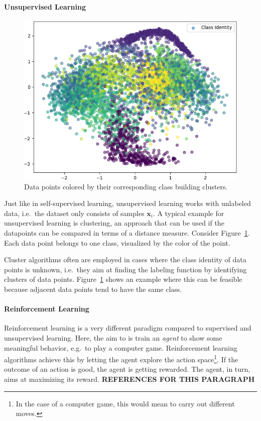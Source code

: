 \paragraph{Unsupervised Learning}
\begin{figure}
    \centering
    \includegraphics[width=.48\textwidth]{images/vlae_embeddings/embeddings_mu_3_6.png}
    \caption[Clusters of data points]{Data points colored by their corresponding class building clusters.}
    \label{fig:clustering_example}
\end{figure}
Just like in self-supervised learning, unsupervised learning works with unlabeled data, i.e.~the dataset only consists of samples $\bm{x}_i$.
A typical example for unsupervised learning is clustering, an approach that can be used if the datapoints can be compared in terms of a distance measure.
Consider Figure~\ref{fig:clustering_example}.
Each data point belongs to one class, visualized by the color of the point.

Cluster algorithms often are employed in cases where the class identity of data points is unknown, i.e.~they aim at finding the labeling function by identifying clusters of data points.
Figure~\ref{fig:clustering_example} shows an example where this can be feasible because adjacent data points tend to have the same class.

\paragraph{Reinforcement Learning}
Reinforcement learning is a very different paradigm compared to supervised and unsupervised learning.
Here, the aim to is train an \textit{agent} to show some meaningful behavior, e.g.~to play a computer game.
Reinforcement learning algorithms achieve this by letting the agent explore the action space\footnote{In the case of a computer game, this would mean to carry out different moves.}.
If the outcome of an action is good, the agent is getting rewarded.
The agent, in turn, aims at maximizing its reward. \textbf{REFERENCES FOR THIS PARAGRAPH}

